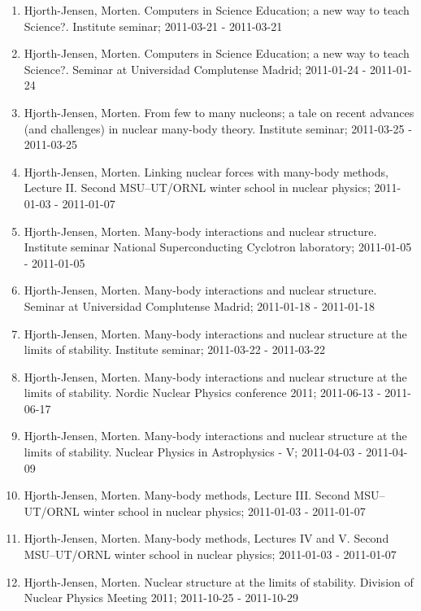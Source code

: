 \documentclass[a4wide,10pt]{article}
\begin{document}
\begin{enumerate}
\item Hjorth-Jensen, Morten.  Computers in Science Education; a new way to teach Science?. Institute seminar; 2011-03-21 - 2011-03-21

\item Hjorth-Jensen, Morten.  Computers in Science Education; a new way to teach Science?. Seminar at Universidad Complutense Madrid; 2011-01-24 - 2011-01-24

\item Hjorth-Jensen, Morten.  From few to many nucleons; a tale on recent advances (and challenges) in nuclear many-body theory. Institute seminar; 2011-03-25 - 2011-03-25

\item Hjorth-Jensen, Morten. Linking nuclear forces with many-body methods, Lecture II. Second MSU--UT/ORNL winter school in nuclear physics; 2011-01-03 - 2011-01-07

\item Hjorth-Jensen, Morten.  Many-body interactions and nuclear structure. Institute seminar National Superconducting Cyclotron laboratory; 2011-01-05 - 2011-01-05

\item Hjorth-Jensen, Morten.  Many-body interactions and nuclear structure. Seminar at Universidad Complutense Madrid; 2011-01-18 - 2011-01-18

\item Hjorth-Jensen, Morten.  Many-body interactions and nuclear structure at the limits of stability. Institute seminar; 2011-03-22 - 2011-03-22

\item Hjorth-Jensen, Morten.  Many-body interactions and nuclear structure at the limits of stability. Nordic Nuclear Physics conference 2011; 2011-06-13 - 2011-06-17

\item Hjorth-Jensen, Morten.  Many-body interactions and nuclear structure at the limits of stability. Nuclear Physics in Astrophysics - V; 2011-04-03 - 2011-04-09

\item Hjorth-Jensen, Morten.  Many-body methods, Lecture III. Second MSU--UT/ORNL winter school in nuclear physics; 2011-01-03 - 2011-01-07

\item Hjorth-Jensen, Morten.  Many-body methods, Lectures IV and V. Second MSU--UT/ORNL winter school in nuclear physics; 2011-01-03 - 2011-01-07

\item Hjorth-Jensen, Morten.  Nuclear structure at the limits of stability. Division of Nuclear Physics Meeting 2011; 2011-10-25 - 2011-10-29


\end{enumerate}
\end{document}
